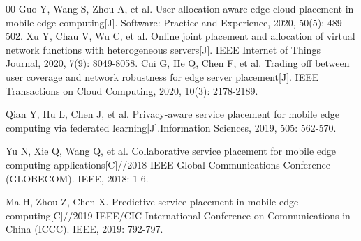 \documentclass[10pt, conference, letterpaper]{IEEEtran}
\begin{document}
\begin{thebibliography}{00}
 Guo Y, Wang S, Zhou A, et al. User allocation-aware edge cloud placement in mobile edge computing[J]. Software: Practice and Experience, 2020, 50(5): 489-502.
 Xu Y, Chau V, Wu C, et al. Online joint placement and allocation of virtual network functions with heterogeneous servers[J]. IEEE Internet of Things Journal, 2020, 7(9): 8049-8058.
 Cui G, He Q, Chen F, et al. Trading off between user coverage and network robustness for edge server placement[J]. IEEE Transactions on Cloud Computing, 2020, 10(3): 2178-2189.

 Qian Y, Hu L, Chen J, et al. Privacy-aware service placement for mobile edge computing via federated learning[J].Information Sciences, 2019, 505: 562-570.

 Yu N, Xie Q, Wang Q, et al. Collaborative service placement for mobile edge computing applications[C]//2018 IEEE Global Communications Conference (GLOBECOM). IEEE, 2018: 1-6.

 Ma H, Zhou Z, Chen X. Predictive service placement in mobile edge computing[C]//2019 IEEE/CIC International Conference on Communications in China (ICCC). IEEE, 2019: 792-797.


\end{thebibliography}
\end{document}
